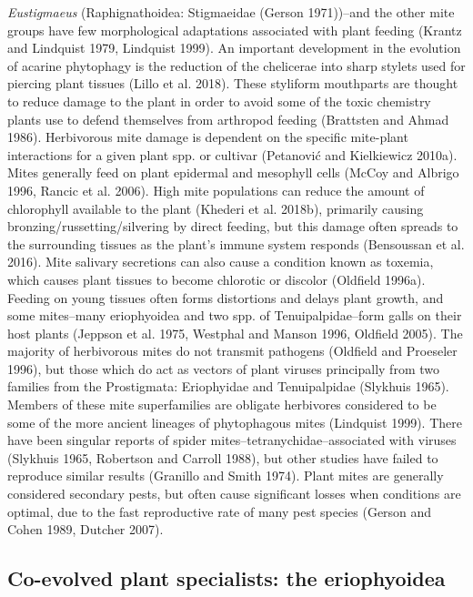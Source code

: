\documentclass[12pt,final,CPage]{ufthesis}
\begin{document}
{\emph{Eustigmaeus} (Raphignathoidea: Stigmaeidae (Gerson 1971))--and the other mite groups have few morphological adaptations associated with plant feeding (Krantz and Lindquist 1979, Lindquist 1999). An important development in the evolution of acarine phytophagy is the reduction of the chelicerae into sharp stylets used for piercing plant tissues (Lillo et al. 2018). These styliform mouthparts are thought to reduce damage to the plant in order to avoid some of the toxic chemistry plants use to defend themselves from arthropod feeding (Brattsten and Ahmad 1986). Herbivorous mite damage is dependent on the specific mite-plant interactions for a given plant spp. or cultivar (Petanović and Kielkiewicz 2010a). Mites generally feed on plant epidermal and mesophyll cells (McCoy and Albrigo 1996, Rancic et al. 2006). High mite populations can reduce the amount of chlorophyll available to the plant (Khederi et al. 2018b), primarily causing bronzing/russetting/silvering by direct feeding, but this damage often spreads to the surrounding tissues as the plant's immune system responds (Bensoussan et al. 2016). Mite salivary secretions can also cause a condition known as toxemia, which causes plant tissues to become chlorotic or discolor (Oldfield 1996a). Feeding on young tissues often forms distortions and delays plant growth, and some mites--many eriophyoidea and two spp. of Tenuipalpidae--form galls on their host plants (Jeppson et al. 1975, Westphal and Manson 1996, Oldfield 2005). The majority of herbivorous mites do not transmit pathogens (Oldfield and Proeseler 1996), but those which do act as vectors of plant viruses principally from two families from the Prostigmata: Eriophyidae and Tenuipalpidae (Slykhuis 1965). Members of these mite superfamilies are obligate herbivores considered to be some of the more ancient lineages of phytophagous mites (Lindquist 1999). There have been singular reports of spider mites--tetranychidae--associated with viruses (Slykhuis 1965, Robertson and Carroll 1988), but other studies have failed to reproduce similar results (Granillo and Smith 1974). Plant mites are generally considered secondary pests, but often cause significant losses when conditions are optimal, due to the fast reproductive rate of many pest species (Gerson and Cohen 1989, Dutcher 2007).

  \hypertarget{erios-litrev}{%
  \subsection{Co-evolved plant specialists: the eriophyoidea}\label{erios-litrev}}

}
\end{document}
